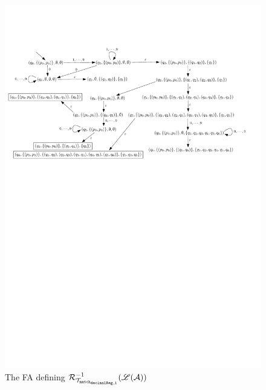 \begin{figure}[ht]
\centering
\includegraphics[width = \textwidth]{psst-preimage-example-new.pdf}
\caption{The FA defining $\mathcal{R}^{-1}_{\mathcal{T}_{\tt match_{decimalReg,1}}}(\mathscr{L}(\mathcal{A}))$}
\label{fig-psst-preimage-exmp}
\end{figure}

